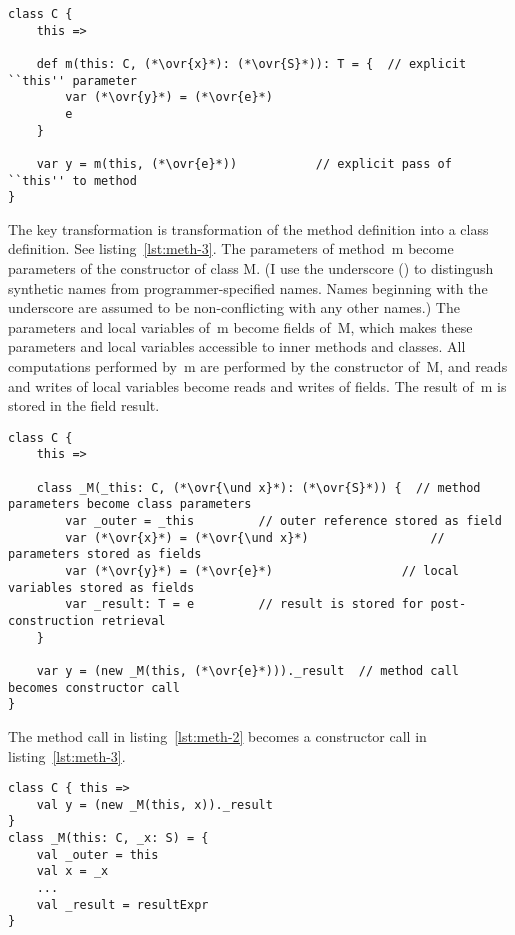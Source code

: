 \begin{lstlisting}[float=htbp, caption={Method Transformation 2 (Explicit This)}, label={lst:meth-2}]
class C {
	this =>

	def m(this: C, (*\ovr{x}*): (*\ovr{S}*)): T = {  // explicit ``this'' parameter
		var (*\ovr{y}*) = (*\ovr{e}*)
		e
	}

	var y = m(this, (*\ovr{e}*))           // explicit pass of ``this'' to method
}
\end{lstlisting}

The key transformation is transformation of the method definition into a class definition. See listing~\ref{lst:meth-3}.
The parameters of method~{\cd m} become parameters of the constructor of class {\cd \und M}. (I use the underscore \mbox{({\cd \und})} to distingush synthetic names from programmer-specified names. Names beginning with the underscore are assumed to be non-conflicting with any other names.)
The parameters and local variables of~{\cd m} become fields of~{\cd \und M}, which makes these parameters and local variables accessible to inner methods and classes.
All computations performed by~{\cd m} are performed by the constructor of~{\cd \und M}, and reads and writes of local variables become reads and writes of fields.
The result of~{\cd m} is stored in the field {\cd \und result}.

\begin{lstlisting}[float=htbp, caption={Method Transformation 3 (Closure)}, label={lst:meth-3}]
class C {
	this =>

	class _M(_this: C, (*\ovr{\und x}*): (*\ovr{S}*)) {  // method parameters become class parameters
		var _outer = _this         // outer reference stored as field
		var (*\ovr{x}*) = (*\ovr{\und x}*)                 // parameters stored as fields
		var (*\ovr{y}*) = (*\ovr{e}*)                  // local variables stored as fields
		var _result: T = e         // result is stored for post-construction retrieval
	}

	var y = (new _M(this, (*\ovr{e}*)))._result  // method call becomes constructor call
}
\end{lstlisting}

The method call in listing~\ref{lst:meth-2} becomes a constructor call in listing~\ref{lst:meth-3}. 




\begin{lstlisting}[float=htbp, caption={Method Transformation 4 (Flattening)}, label={lst:meth-4}]
class C { this =>
	val y = (new _M(this, x))._result
}
class _M(this: C, _x: S) = {
	val _outer = this
	val x = _x
	...
	val _result = resultExpr
}
\end{lstlisting}



